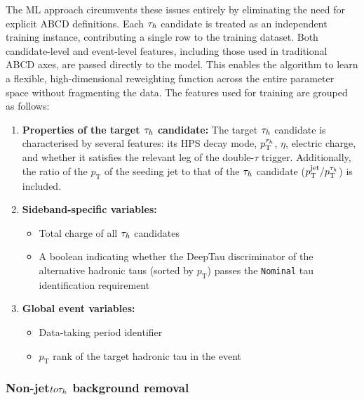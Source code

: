 The ML approach circumvents these issues entirely by eliminating the need for explicit ABCD definitions. Each $\tau_h$ candidate is treated as an independent training instance, contributing a single row to the training dataset. Both candidate-level and event-level features, including those used in traditional ABCD axes, are passed directly to the model. This enables the algorithm to learn a flexible, high-dimensional reweighting function across the entire parameter space without fragmenting the data. The features used for training are grouped as follows:

\begin{enumerate}[label=(\roman*)]

    \item \textbf{Properties of the target $\tau_h$ candidate:} The target $\tau_h$ candidate is characterised by several features: its HPS decay mode, $p_\text{T}^{\tau_h}$,  $\eta$, electric charge, and whether it satisfies the relevant leg of the double-$\tau$ trigger. Additionally, the ratio of the $p_\text{T}$ of the seeding jet to that of the $\tau_h$ candidate ($p_\text{T}^\text{jet} / p_\text{T}^{\tau_h}$) is included.

    \item \textbf{Sideband-specific variables:}
    \begin{itemize}
        \item Total charge of all $\tau_h$ candidates
        \item A boolean indicating whether the DeepTau discriminator of the alternative hadronic taus (sorted by $p_\text{T}$) passes the \texttt{Nominal} tau identification requirement
    \end{itemize}

    \item \textbf{Global event variables:}
    \begin{itemize}
        \item Data-taking period identifier
        \item $p_\text{T}$ rank of the target hadronic tau in the event
    \end{itemize}

\end{enumerate}

\subsubsection{\texorpdfstring{Non-jet$to \tau_h$ background removal}{Non-jet to hadronic tau background removal}}

